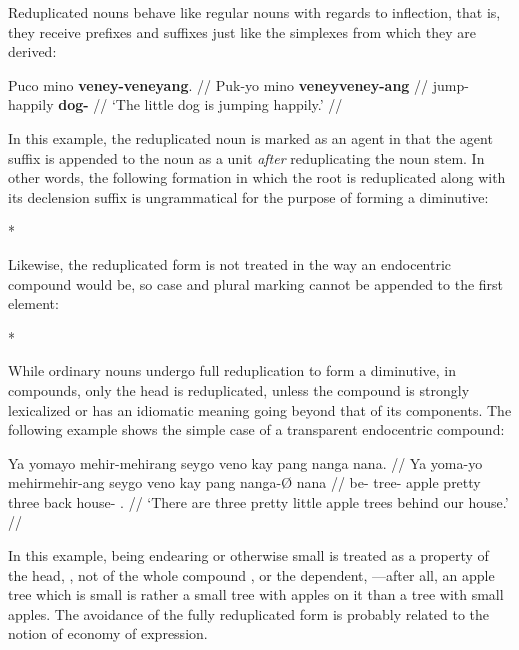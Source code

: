 Reduplicated nouns behave like regular nouns with regards to inflection, that 
is, they receive prefixes and suffixes just like the simplexes from which they 
are derived:

\ex\begingl
	\gla Puco mino \textbf{veney-veneyang}. //
	\glb Puk-yo mino \textbf{veney\til{}veney-ang} //
	\glc jump-\TsgN{} happily \textbf{\Dim{}\til{}dog-\Aarg{}} //
	\glft `The little dog is jumping happily.' //
\endgl\xe

In this example, the reduplicated noun  is 
marked as an agent in that the agent suffix  is appended to 
the noun as a unit \emph{after} reduplicating the noun stem. In other words, the 
following formation in which the root is reduplicated along with its declension 
suffix is ungrammatical for the purpose of forming a diminutive:

\ex
	*
\xe

Likewise, the reduplicated form is not treated in the way an endocentric 
compound would be, so case and plural marking cannot be appended to the first 
element:

\ex
	*
\xe

While ordinary nouns undergo full reduplication to form a diminutive, in 
compounds, only the head is reduplicated, unless the compound is strongly 
lexicalized or has an idiomatic meaning going beyond that of its components. 
The following example shows the simple case of a transparent endocentric 
compound:

\ex\begingl
	\gla Ya yomayo mehir-mehirang seygo veno kay pang nanga nana. //
	\glb Ya yoma-yo mehir\til{}mehir-ang seygo veno kay pang nanga-Ø nana //
	\glc \LocT{} be-\TsgN{} \Dim{}\til{}tree-\Aarg{} apple pretty three 
		back house-\Top{} \Fpl{}.\Gen{} //
	\glft `There are three pretty little apple trees behind our house.' //
\endgl\xe

In this example, being endearing or otherwise small is treated as a property of 
the head, , not of the whole compound 
, or the dependent, 
---after all, an apple tree which is small is 
rather a small tree with apples on it than a tree with small apples. The 
avoidance of the fully reduplicated form 
 is probably related to the 
notion of economy of expression.


